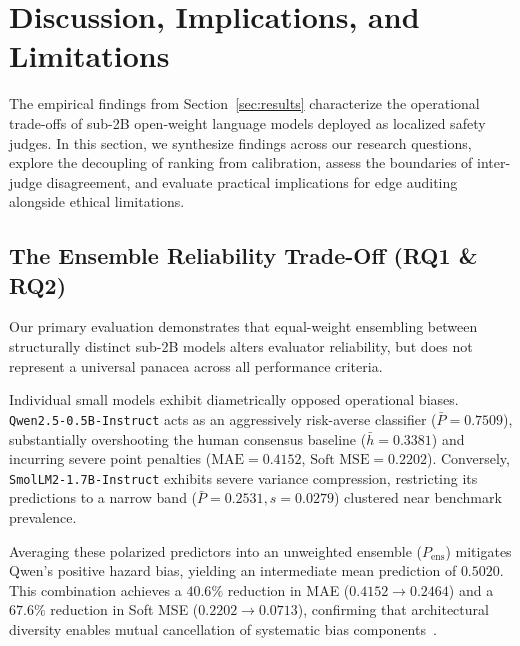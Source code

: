 \section{Discussion, Implications, and Limitations}
\label{sec:discussion}

The empirical findings from Section~\ref{sec:results} characterize the operational trade-offs of sub-2B open-weight language models deployed as localized safety judges. In this section, we synthesize findings across our research questions, explore the decoupling of ranking from calibration, assess the boundaries of inter-judge disagreement, and evaluate practical implications for edge auditing alongside ethical limitations.

\subsection{The Ensemble Reliability Trade-Off (RQ1 \& RQ2)}
\label{subsec:disc_ensemble_tradeoff}

Our primary evaluation demonstrates that equal-weight ensembling between structurally distinct sub-2B models alters evaluator reliability, but does not represent a universal panacea across all performance criteria.

Individual small models exhibit diametrically opposed operational biases. \texttt{Qwen2.5-0.5B-Instruct} acts as an aggressively risk-averse classifier ($\bar{P}=0.7509$), substantially overshooting the human consensus baseline ($\bar{h}=0.3381$) and incurring severe point penalties ($\text{MAE}=0.4152$, $\text{Soft MSE}=0.2202$). Conversely, \texttt{SmolLM2-1.7B-Instruct} exhibits severe variance compression, restricting its predictions to a narrow band ($\bar{P}=0.2531, s=0.0279$) clustered near benchmark prevalence.

Averaging these polarized predictors into an unweighted ensemble ($P_{\text{ens}}$) mitigates Qwen's positive hazard bias, yielding an intermediate mean prediction of $0.5020$. This combination achieves a $40.6\%$ reduction in MAE ($0.4152 \to 0.2464$) and a $67.6\%$ reduction in Soft MSE ($0.2202 \to 0.0713$), confirming that architectural diversity enables mutual cancellation of systematic bias components~\cite{lakshminarayanan2017simple,ovadia2019can}.

